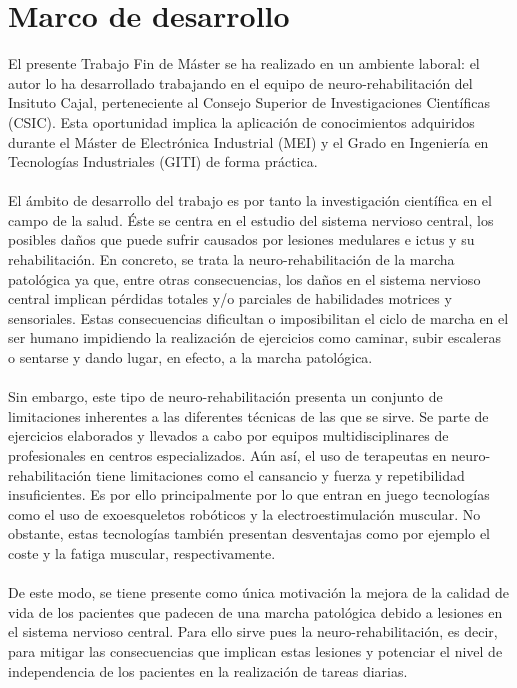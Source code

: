 \section{Marco de desarrollo}
El presente Trabajo Fin de Máster se ha realizado en un ambiente laboral: el autor lo ha desarrollado trabajando en el equipo de neuro-rehabilitación del Insituto Cajal\cite{equipo_cajal}, perteneciente al Consejo Superior de Investigaciones Científicas (CSIC). Esta oportunidad implica la aplicación de conocimientos adquiridos durante el Máster de Electrónica Industrial (MEI) y el Grado en Ingeniería en Tecnologías Industriales (GITI) de forma práctica. 
\\
\\
El ámbito de desarrollo del trabajo es por tanto la investigación científica en el campo de la salud. Éste se centra en el estudio del sistema nervioso central, los posibles daños que puede sufrir causados por lesiones medulares e ictus y su rehabilitación. En concreto, se trata la neuro-rehabilitación de la marcha patológica ya que, entre otras consecuencias, los daños en el sistema nervioso central implican pérdidas totales y/o parciales de habilidades motrices y sensoriales. Estas consecuencias dificultan o imposibilitan el ciclo de marcha en el ser humano impidiendo la realización de ejercicios como caminar, subir escaleras o sentarse y dando lugar, en efecto, a la marcha patológica.
\\
\\
Sin embargo, este tipo de neuro-rehabilitación presenta un conjunto de limitaciones inherentes a las diferentes técnicas de las que se sirve. Se parte de ejercicios elaborados y llevados a cabo por equipos multidisciplinares de profesionales en centros especializados. Aún así, el uso de terapeutas en neuro-rehabilitación tiene limitaciones como el cansancio y fuerza y repetibilidad insuficientes. Es por ello principalmente por lo que entran en juego tecnologías como el uso de exoesqueletos robóticos y la electroestimulación muscular. No obstante, estas tecnologías también presentan desventajas como por ejemplo el coste y la fatiga muscular, respectivamente.
\\
\\
De este modo, se tiene presente como única motivación la mejora de la calidad de vida de los pacientes que padecen de una marcha patológica debido a lesiones en el sistema nervioso central. Para ello sirve pues la neuro-rehabilitación, es decir, para mitigar las consecuencias que implican estas lesiones y potenciar el nivel de independencia de los pacientes en la realización de tareas diarias.
